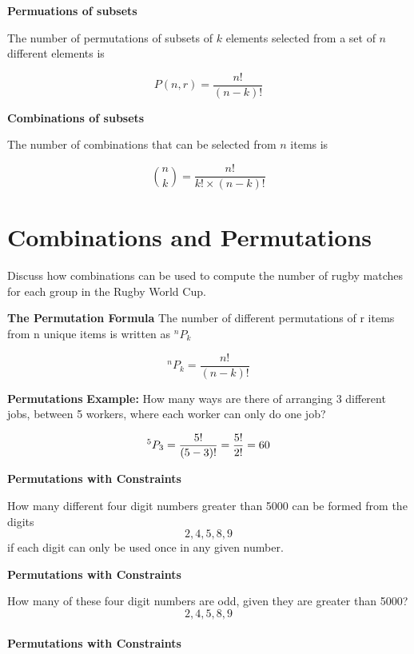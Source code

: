 \documentclass[]{report}
\begin{document}
	
	
	
	\textbf{Permuations of subsets}
	
	The number of permutations of subsets of $k$ elements selected from a set of $n$ different elements is
	
	\[P(n,r) = \frac{n!}{(n-k)!}  \]
	
	
	\textbf{Combinations of subsets}
	
	The number of combinations that can be selected from $n$ items is
	
	\[ {n \choose k} = \frac{n!}{k! \times (n-k)!}  \]
	
	
	
	\section{ Combinations and Permutations }
	
	
	

	
	\bigskip
	Discuss how combinations can be used to compute the number of rugby matches for each group in the Rugby World Cup.
	
	\textbf{The Permutation Formula}
	The number of different permutations of r items from n unique items is written as $^n P_k$
	
	
	\[ ^n P_k = \frac{n!}{(n-k)!}\]
	
	
	
	\textbf{Permutations}
	\textbf{Example:}
	How many ways are there of arranging 3 different jobs, between 5 workers, where each worker can only do one job?
	
	
	\[ ^5 P_3 = \frac{5!}{(5-3)!}  = {5! \over 2!} = 60\]
	
	
	\textbf{Permutations with Constraints}
	
	How many different four digit numbers greater than 5000 can be formed from the digits \[2,4,5,8,9\] if each digit can only be used once in any given number.
	
	\textbf{Permutations with Constraints}
	
	How many of these four digit numbers are odd, given they are greater than 5000?
	\[2,4,5,8,9\]\\
	
	
	\textbf{Permutations with Constraints}
	
	
	
	

	
	
\end{document}
